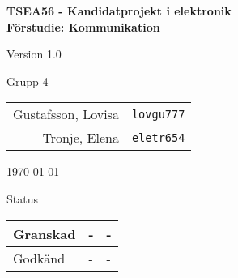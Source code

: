 \documentclass[11pt]{article}
\begin{document}
 
\begin{titlepage}
\begin{center}

{\Large\bfseries TSEA56 - Kandidatprojekt i elektronik \\ Förstudie: Kommunikation}

\vspace{5em}

Version 1.0

\vspace{5em}
Grupp 4 \\
\begin{tabular}{rl}
Gustafsson, Lovisa&\verb+lovgu777+
\\
Tronje, Elena&\verb+eletr654+
\\
\end{tabular}

\vspace{5em}
\today

\vspace{16em}
Status
\begin{longtable}{|l|l|l|} \hline

Granskad & - & - \\ \hline
Godkänd & - & - \\ \hline
 
\end{longtable}

\end{center}
\end{titlepage}
\end{document}

